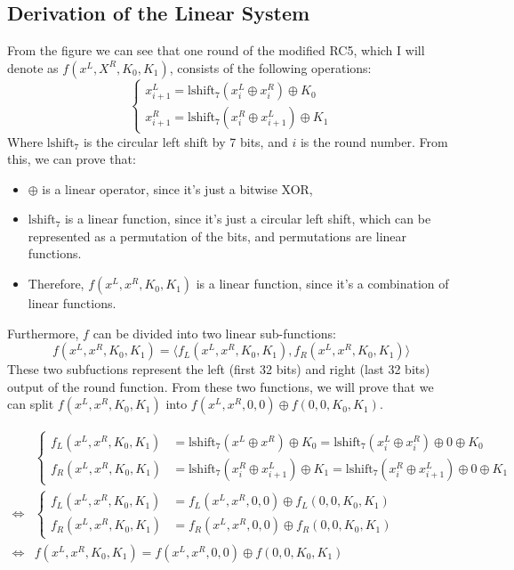 \documentclass{article}
\begin{document}
\subsection{Derivation of the Linear System}
From the figure we can see that one round of the modified RC5, which I will denote as $f(x^L, X^R, K_0, K_1)$, consists of the following operations:
\begin{equation}
\begin{cases}
    x^L_{i+1} = \text{lshift}_7(x_{i}^L \oplus x_i^R) \oplus K_0 \\
    x^R_{i+1} = \text{lshift}_7(x_{i}^R \oplus x^L_{i+1}) \oplus K_1
\end{cases}
\end{equation}
Where $\text{lshift}_7$ is the circular left shift by 7 bits, and $i$ is the round number.
From this, we can prove that:
\begin{itemize}
    \item $\oplus$ is a linear operator, since it's just a bitwise XOR,
    \item $\text{lshift}_7$ is a linear function, since it's just a circular left shift, which can be represented as a permutation of the bits, and permutations are linear functions.
    \item Therefore, $f(x^L, x^R, K_0, K_1)$ is a linear function, since it's a combination of linear functions.
\end{itemize}

Furthermore, $f$ can be divided into two linear sub-functions: 
\begin{equation}
f(x^L, x^R, K_0, K_1)=\langle f_L(x^L, x^R, K_0, K_1), f_R(x^L, x^R, K_0, K_1) \rangle
\end{equation}
These two subfuctions represent the left (first 32 bits) and right (last 32 bits) output of the round function.
From these two functions, we will prove that we can split $f(x^L, x^R, K_0, K_1)$ into $f(x^L, x^R, 0, 0) \oplus f(0, 0, K_0, K_1)$.

\begin{equation}
\begin{aligned}
    &\begin{cases}
        f_L(x^L, x^R, K_0, K_1) &= \text{lshift}_7(x^L \oplus x^R) \oplus K_0 = \text{lshift}_7(x_{i}^L \oplus x_i^R) \oplus 0 \oplus K_0 \\
        f_R(x^L, x^R, K_0, K_1) &= \text{lshift}_7(x_{i}^R \oplus x^L_{i+1}) \oplus K_1 = \text{lshift}_7(x_{i}^R \oplus x^L_{i+1}) \oplus 0 \oplus K_1
    \end{cases} \\
    \Leftrightarrow &\begin{cases}
        f_L(x^L, x^R, K_0, K_1) &= f_L(x^L, x^R, 0, 0) \oplus f_L(0, 0, K_0, K_1)\\
        f_R(x^L, x^R, K_0, K_1) &= f_R(x^L, x^R, 0, 0) \oplus f_R(0, 0, K_0, K_1)
    \end{cases} \\
    \Leftrightarrow & f(x^L, x^R, K_0, K_1) = f(x^L, x^R, 0, 0) \oplus f(0, 0, K_0, K_1)
\end{aligned}
\end{equation}
\end{document}
